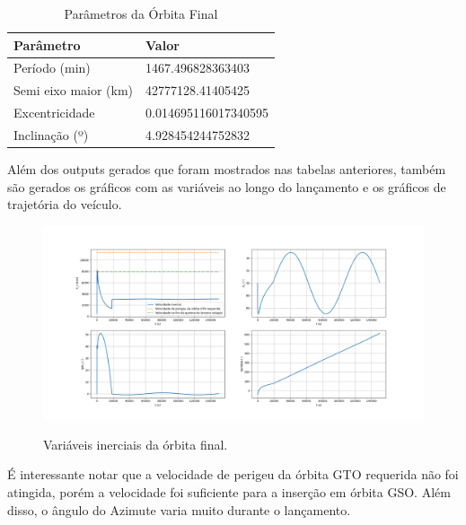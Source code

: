 \begin{table}[H]
\centering
\caption{Parâmetros da Órbita Final}
\begin{tabular}{|l|l|}
\hline
\textbf{Parâmetro} & \textbf{Valor} \\
\hline
Período (min) & 1467.496828363403 \\
Semi eixo maior (km) & 42777128.41405425 \\
Excentricidade & 0.014695116017340595 \\
Inclinação (º) & 4.928454244752832 \\
\hline
\end{tabular}

\end{table}

Além dos outputs gerados que foram mostrados nas tabelas anteriores, também são gerados os gráficos com as variáveis ao longo do lançamento e os gráficos de trajetória do veículo. 

\begin{figure}[H]
    \begin{center}
        \caption{Variáveis inerciais da órbita final.}
        \includegraphics[width=6in]{figuras/Figure_2.png}
        \label{fig:3}
     \end{center}
\end{figure}

É interessante notar que a velocidade de perigeu da órbita GTO requerida não foi atingida, porém a velocidade foi suficiente para a inserção em órbita GSO. Além disso, o ângulo do Azimute varia muito durante o lançamento. 

